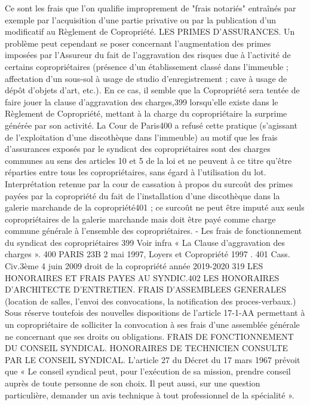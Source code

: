 		Ce sont les frais que l'on qualifie improprement de "frais notariés" entraînés par exemple par l'acquisition d'une partie privative ou par la publication d'un modificatif au Règlement de Copropriété.
		LES PRIMES D'ASSURANCES.
		Un problème peut cependant se poser concernant l'augmentation des primes imposées par l'Assureur du fait de l'aggravation des risques due à l'activité de certains copropriétaires (présence d'un établissement classé dans l’immeuble ; affectation d'un sous-sol à usage de studio d’enregistrement ; cave à usage de dépôt d'objets d'art, etc.).
		En ce cas, il semble que la Copropriété sera tentée de faire jouer la clause d'aggravation des charges,399 lorsqu'elle existe dans le Règlement de Copropriété, mettant à la charge du copropriétaire la surprime générée par son activité. La Cour de Paris400 a refusé cette pratique (s’agissant de l’exploitation d’une discothèque dans l’immeuble) au motif que les frais d’assurances exposés par le syndicat des copropriétaires sont des charges communes au sens des articles 10 et 5 de la loi et ne peuvent à ce titre qu’être réparties entre tous les copropriétaires, sans égard à l’utilisation du lot.
		Interprétation retenue par la cour de cassation à propos du surcoût des primes payées par la copropriété du fait de l’installation d’une discothèque dans la galerie marchande de la copropriété401 ; ce surcoût ne peut être imputé aux seuls copropriétaires de la galerie marchande mais doit être payé comme charge commune générale à l’ensemble des copropriétaires.
		- Les frais de fonctionnement du syndicat des copropriétaires
		399 Voir infra  « La Clause d’aggravation des charges ».
		400 PARIS 23\degres B 2 mai 1997, Loyers et Copropriété 1997 .
		401 Cass. Civ.3ème 4 juin 2009
		droit de la copropriété année 2019-2020
		319
		LES HONORAIRES ET FRAIS PAYES AU SYNDIC.402
		LES HONORAIRES D'ARCHITECTE D'ENTRETIEN.
		FRAIS D'ASSEMBLEES GENERALES
		(location de salles, l'envoi des convocations, la notification des proces-verbaux.) Sous réserve toutefois des nouvelles dispositions de l’article 17-1-AA permettant à un copropriétaire de solliciter la convocation à ses frais d’une assemblée générale ne concernant que ses droits ou obligations.
		FRAIS DE FONCTIONNEMENT DU CONSEIL SYNDICAL.
		HONORAIRES DE TECHNICIEN CONSULTE PAR LE CONSEIL SYNDICAL.
		L'article 27 du Décret du 17 mars 1967 prévoit que « Le conseil syndical peut, pour l'exécution de sa mission, prendre conseil auprès de toute personne de son choix. Il peut aussi, sur une question particulière, demander un avis technique à tout professionnel de la spécialité ».
